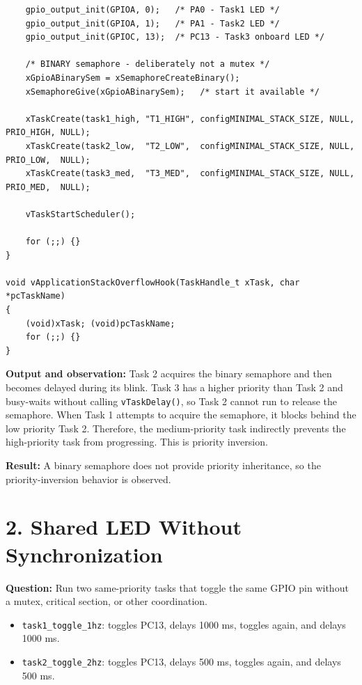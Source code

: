 ﻿\documentclass[12pt,a4paper]{article}
\begin{document}
\begin{lstlisting}
    gpio_output_init(GPIOA, 0);   /* PA0 - Task1 LED */
    gpio_output_init(GPIOA, 1);   /* PA1 - Task2 LED */
    gpio_output_init(GPIOC, 13);  /* PC13 - Task3 onboard LED */

    /* BINARY semaphore - deliberately not a mutex */
    xGpioABinarySem = xSemaphoreCreateBinary();
    xSemaphoreGive(xGpioABinarySem);   /* start it available */

    xTaskCreate(task1_high, "T1_HIGH", configMINIMAL_STACK_SIZE, NULL, PRIO_HIGH, NULL);
    xTaskCreate(task2_low,  "T2_LOW",  configMINIMAL_STACK_SIZE, NULL, PRIO_LOW,  NULL);
    xTaskCreate(task3_med,  "T3_MED",  configMINIMAL_STACK_SIZE, NULL, PRIO_MED,  NULL);

    vTaskStartScheduler();

    for (;;) {}
}

void vApplicationStackOverflowHook(TaskHandle_t xTask, char *pcTaskName)
{
    (void)xTask; (void)pcTaskName;
    for (;;) {}
}
\end{lstlisting}

\textbf{Output and observation:}
Task 2 acquires the binary semaphore and then becomes delayed during its
blink. Task 3 has a higher priority than Task 2 and busy-waits without
calling \texttt{vTaskDelay()}, so Task 2 cannot run to release the semaphore.
When Task 1 attempts to acquire the semaphore, it blocks behind the low
priority Task 2. Therefore, the medium-priority task indirectly prevents the
high-priority task from progressing. This is priority inversion.

\textbf{Result:} A binary semaphore does not provide priority inheritance, so
the priority-inversion behavior is observed.

\newpage
\section*{2. Shared LED Without Synchronization}
\textbf{Question:} Run two same-priority tasks that toggle the same GPIO pin
without a mutex, critical section, or other coordination.

\begin{itemize}[noitemsep]
    \item \texttt{task1\_toggle\_1hz}: toggles PC13, delays 1000 ms, toggles
          again, and delays 1000 ms.
    \item \texttt{task2\_toggle\_2hz}: toggles PC13, delays 500 ms, toggles
          again, and delays 500 ms.
\end{itemize}
\end{document}
